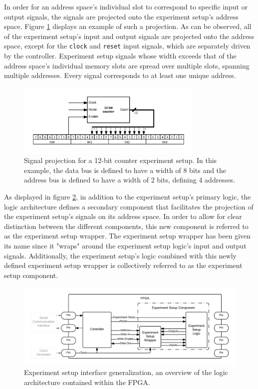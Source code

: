 \documentclass[main.tex]{subfiles}
\begin{document}
In order for an address space's individual slot to correspond to specific input or output signals, the signals are projected onto the experiment setup's address space. Figure \ref{fig:signal-address-projection} displays an example of such a projection. As can be observed, all of the experiment setup's input and output signals are projected onto the address space, except for the \texttt{clock} and \texttt{reset} input signals, which are separately driven by the controller. Experiment setup signals whose width exceeds that of the address space's individual memory slots are spread over multiple slots, spanning multiple addresses. Every signal corresponds to at least one unique address.

\begin{figure}[h]
    \centering
    \caption{Signal projection for a 12-bit counter experiment setup. In this example, the data bus is defined to have a width of 8 bits and the address bus is defined to have a width of 2 bits, defining 4 addresses.}
    \label{fig:signal-address-projection}
    \includegraphics[width=0.8\textwidth]{img/signal-address-projection}
\end{figure}

As displayed in figure \ref{fig:fpga-abstract}, in addition to the experiment setup's primary logic, the logic architecture defines a secondary component that facilitates the projection of the experiment setup's signals on its address space. In order to allow for clear distinction between the different components, this new component is referred to as the experiment setup wrapper. The experiment setup wrapper has been given its name since it "wraps" around the experiment setup logic's input and output signals.  Additionally, the experiment setup's logic combined with this newly defined experiment setup wrapper is collectively referred to as the experiment setup component.

\begin{figure}[h]
\centering
\caption{Experiment setup interface generalization, an overview of the logic architecture contained within the FPGA.}
\label{fig:fpga-abstract}
\includegraphics[width=.8\textwidth]{img/fpga-abstract}
\end{figure}
\end{document}
